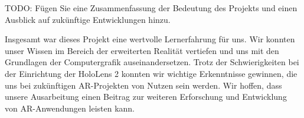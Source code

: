 TODO: Fügen Sie eine Zusammenfassung der Bedeutung des Projekts und einen Ausblick auf zukünftige Entwicklungen hinzu.


Insgesamt war dieses Projekt eine wertvolle Lernerfahrung für uns.
Wir konnten unser Wissen im Bereich der erweiterten Realität vertiefen und uns mit den Grundlagen der Computergrafik auseinandersetzen.
Trotz der Schwierigkeiten bei der Einrichtung der HoloLens 2 konnten wir wichtige Erkenntnisse gewinnen, die uns bei zukünftigen AR-Projekten von Nutzen sein werden.
Wir hoffen, dass unsere Ausarbeitung einen Beitrag zur weiteren Erforschung und Entwicklung von AR-Anwendungen leisten kann.
